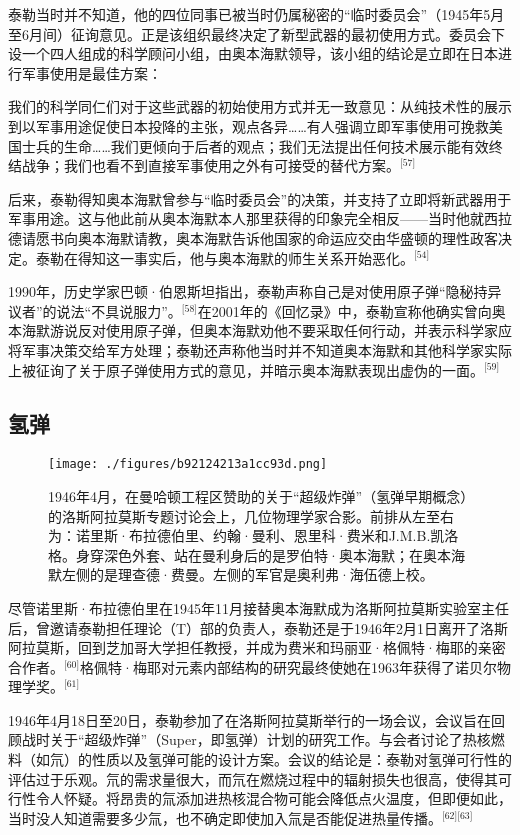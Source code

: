 泰勒当时并不知道，他的四位同事已被当时仍属秘密的“临时委员会”（1945年5月至6月间）征询意见。正是该组织最终决定了新型武器的最初使用方式。委员会下设一个四人组成的科学顾问小组，由奥本海默领导，该小组的结论是立即在日本进行军事使用是最佳方案：

我们的科学同仁们对于这些武器的初始使用方式并无一致意见：从纯技术性的展示到以军事用途促使日本投降的主张，观点各异……有人强调立即军事使用可挽救美国士兵的生命……我们更倾向于后者的观点；我们无法提出任何技术展示能有效终结战争；我们也看不到直接军事使用之外有可接受的替代方案。\(^\text{[57]}\)

后来，泰勒得知奥本海默曾参与“临时委员会”的决策，并支持了立即将新武器用于军事用途。这与他此前从奥本海默本人那里获得的印象完全相反——当时他就西拉德请愿书向奥本海默请教，奥本海默告诉他国家的命运应交由华盛顿的理性政客决定。泰勒在得知这一事实后，他与奥本海默的师生关系开始恶化。\(^\text{[54]}\)

1990年，历史学家巴顿·伯恩斯坦指出，泰勒声称自己是对使用原子弹“隐秘持异议者”的说法“不具说服力”。\(^\text{[58]}\)在2001年的《回忆录》中，泰勒宣称他确实曾向奥本海默游说反对使用原子弹，但奥本海默劝他不要采取任何行动，并表示科学家应将军事决策交给军方处理；泰勒还声称他当时并不知道奥本海默和其他科学家实际上被征询了关于原子弹使用方式的意见，并暗示奥本海默表现出虚伪的一面。\(^\text{[59]}\)
\subsection{氢弹}
\begin{figure}[ht]
\centering
\texttt{[image: ./figures/b92124213a1cc93d.png]}
\caption{1946年4月，在曼哈顿工程区赞助的关于“超级炸弹”（氢弹早期概念）的洛斯阿拉莫斯专题讨论会上，几位物理学家合影。前排从左至右为：诺里斯·布拉德伯里、约翰·曼利、恩里科·费米和J.M.B.凯洛格。身穿深色外套、站在曼利身后的是罗伯特·奥本海默；在奥本海默左侧的是理查德·费曼。左侧的军官是奥利弗·海伍德上校。} \label{fig_ADHTL_5}
\end{figure}
尽管诺里斯·布拉德伯里在1945年11月接替奥本海默成为洛斯阿拉莫斯实验室主任后，曾邀请泰勒担任理论（T）部的负责人，泰勒还是于1946年2月1日离开了洛斯阿拉莫斯，回到芝加哥大学担任教授，并成为费米和玛丽亚·格佩特·梅耶的亲密合作者。\(^\text{[60]}\)格佩特·梅耶对元素内部结构的研究最终使她在1963年获得了诺贝尔物理学奖。\(^\text{[61]}\)

1946年4月18日至20日，泰勒参加了在洛斯阿拉莫斯举行的一场会议，会议旨在回顾战时关于“超级炸弹”（Super，即氢弹）计划的研究工作。与会者讨论了热核燃料（如氘）的性质以及氢弹可能的设计方案。会议的结论是：泰勒对氢弹可行性的评估过于乐观。氘的需求量很大，而氘在燃烧过程中的辐射损失也很高，使得其可行性令人怀疑。将昂贵的氚添加进热核混合物可能会降低点火温度，但即便如此，当时没人知道需要多少氚，也不确定即使加入氚是否能促进热量传播。\(^\text{[62][63]}\)

